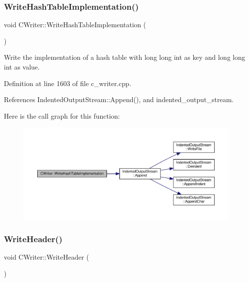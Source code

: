 \subsubsection{\texorpdfstring{Write\+Hash\+Table\+Implementation()}{WriteHashTableImplementation()}}
{\footnotesize\ttfamily void C\+Writer\+::\+Write\+Hash\+Table\+Implementation (\begin{DoxyParamCaption}{ }\end{DoxyParamCaption})\hspace{0.3cm}{\ttfamily [protected]}}



Write the implementation of a hash table with long long int as key and long long int as value. 



Definition at line 1603 of file c\+\_\+writer.\+cpp.



References Indented\+Output\+Stream\+::\+Append(), and indented\+\_\+output\+\_\+stream.

Here is the call graph for this function\+:
\nopagebreak
\begin{figure}[H]
\begin{center}
\leavevmode
\includegraphics[width=350pt]{d3/d59/classCWriter_a22766bb22fb01e96257b27095bf035ef_cgraph}
\end{center}
\end{figure}
\mbox{\label{classCWriter_a04b8381e64ef2e49ec7cfc308e10e10a}} 
\subsubsection{\texorpdfstring{Write\+Header()}{WriteHeader()}}
{\footnotesize\ttfamily void C\+Writer\+::\+Write\+Header (\begin{DoxyParamCaption}{ }\end{DoxyParamCaption})\hspace{0.3cm}{\ttfamily [virtual]}}



